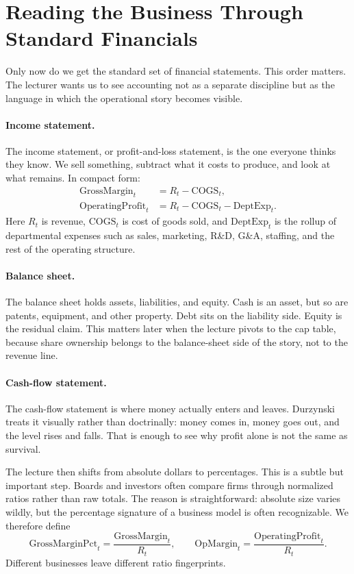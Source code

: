 \section{Reading the Business Through Standard Financials}

Only now do we get the standard set of financial statements. This order matters. The lecturer wants us to see accounting not as a separate discipline but as the language in which the operational story becomes visible.

\paragraph{Income statement.}
The income statement, or profit-and-loss statement, is the one everyone thinks they know. We sell something, subtract what it costs to produce, and look at what remains. In compact form:
\begin{align}
\mathrm{GrossMargin}_t &= R_t - \mathrm{COGS}_t, \\
\mathrm{OperatingProfit}_t &= R_t - \mathrm{COGS}_t - \mathrm{DeptExp}_t.
\end{align}
Here \(R_t\) is revenue, \(\mathrm{COGS}_t\) is cost of goods sold, and \(\mathrm{DeptExp}_t\) is the rollup of departmental expenses such as sales, marketing, R\&D, G\&A, staffing, and the rest of the operating structure.

\paragraph{Balance sheet.}
The balance sheet holds assets, liabilities, and equity. Cash is an asset, but so are patents, equipment, and other property. Debt sits on the liability side. Equity is the residual claim. This matters later when the lecture pivots to the cap table, because share ownership belongs to the balance-sheet side of the story, not to the revenue line.

\paragraph{Cash-flow statement.}
The cash-flow statement is where money actually enters and leaves. Durzynski treats it visually rather than doctrinally: money comes in, money goes out, and the level rises and falls. That is enough to see why profit alone is not the same as survival.

The lecture then shifts from absolute dollars to percentages. This is a subtle but important step. Boards and investors often compare firms through normalized ratios rather than raw totals. The reason is straightforward: absolute size varies wildly, but the percentage signature of a business model is often recognizable. We therefore define
\begin{equation}
\mathrm{GrossMarginPct}_t = \frac{\mathrm{GrossMargin}_t}{R_t},
\qquad
\mathrm{OpMargin}_t = \frac{\mathrm{OperatingProfit}_t}{R_t}.
\end{equation}
Different businesses leave different ratio fingerprints.

